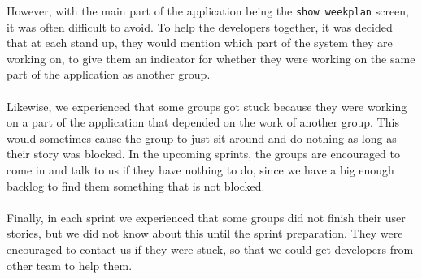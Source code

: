 However, with the main part of the application being the \texttt{show weekplan} screen, it was often difficult to avoid. 
To help the developers together, it was decided that at each stand up, they would mention which part of the system they are working on, to give them an indicator for whether they were working on the same part of the application as another group.
\\\\
Likewise, we experienced that some groups got stuck because they were working on a part of the application that depended on the work of another group.
This would sometimes cause the group to just sit around and do nothing as long as their story was blocked.
In the upcoming sprints, the groups are encouraged to come in and talk to us if they have nothing to do, since we have a big enough backlog to find them something that is not blocked.
\\\\
Finally, in each sprint we experienced that some groups did not finish their user stories, but we did not know about this until the sprint preparation.
They were encouraged to contact us if they were stuck, so that we could get developers from other team to help them.
\\\\
